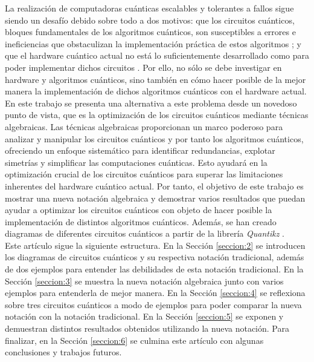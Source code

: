 \documentclass[10pt,conference,a4paper]{IEEEtran}
\begin{document}
    La realización de computadoras cuánticas escalables y tolerantes a fallos sigue siendo un desafío debido sobre todo a dos motivos: que los circuitos cuánticos,  bloques fundamentales de los algoritmos cuánticos, son susceptibles a errores e ineficiencias que obstaculizan la implementación práctica de estos algoritmos \cite{error_correction}; y que el hardware cuántico actual no está lo suficientemente desarrollado como para poder implementar dichos circuitos \cite{IBM_hardware}. Por ello, no sólo se debe investigar en   hardware y  algoritmos cuánticos, sino también en cómo hacer posible de la mejor manera la implementación de dichos algoritmos cuánticos con el hardware actual. En este trabajo se presenta una  alternativa a este problema desde un novedoso punto de vista, que es la optimización de los circuitos cuánticos mediante técnicas algebraicas. Las técnicas algebraicas proporcionan un marco poderoso para analizar y manipular los circuitos cuánticos y por tanto los algoritmos cuánticos, ofreciendo un enfoque sistemático para identificar redundancias, explotar simetrías y simplificar las computaciones cuánticas. Esto ayudará en la optimización crucial de los circuitos cuánticos para superar las limitaciones inherentes del hardware cuántico actual. Por tanto, el objetivo de este trabajo es mostrar una nueva notación algebraica y demostrar varios resultados que puedan ayudar a optimizar los circuitos cuánticos con objeto de hacer posible la implementación de distintos algoritmos cuánticos. Además, se han creado diagramas de diferentes circuitos cuánticos a partir de la librería \textit{Quantikz} \cite{quantikz}.\\
    Este artículo sigue la siguiente estructura. En la Sección \ref{seccion:2} se introducen los diagramas de circuitos cuánticos y su respectiva notación tradicional, además de dos ejemplos para entender las debilidades de esta notación tradicional. En la Sección \ref{seccion:3} se muestra la nueva notación algebraica junto con varios ejemplos para entenderla de mejor manera. En la Sección \ref{seccion:4} se reflexiona sobre tres circuitos cuánticos a modo de ejemplos para poder comparar la nueva notación con la notación tradicional. En la Sección \ref{seccion:5} se exponen y demuestran distintos resultados obtenidos utilizando la nueva notación. Para finalizar, en la Sección \ref{seccion:6} se culmina este artículo con algunas conclusiones y trabajos futuros.
\end{document}
